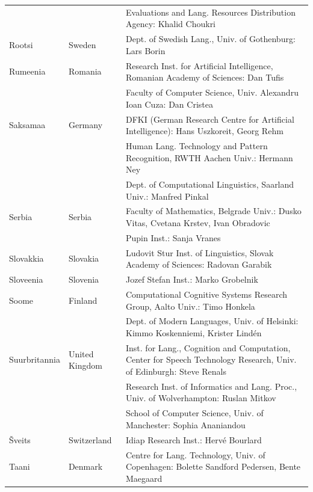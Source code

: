 \documentclass[]{../metanetpaper}
\begin{document}
\begin{longtable}{llp{105mm}}
  & & Evaluations and Lang. Resources Distribution Agency: Khalid Choukri\\ \addlinespace 
  Rootsi & \textcolor{grey1}{Sweden} & Dept. of Swedish Lang., Univ. of Gothenburg: Lars Borin \\ \addlinespace 
  Rumeenia & \textcolor{grey1}{Romania} & Research Inst. for Artificial Intelligence, Romanian Academy of Sciences: Dan Tufis \\ \addlinespace
  & & Faculty of Computer Science, Univ. Alexandru Ioan Cuza: Dan Cristea \\ \addlinespace
  Saksamaa & \textcolor{grey1}{Germany} & DFKI (German Research Centre for Artificial Intelligence): Hans Uszkoreit, Georg Rehm\\ \addlinespace
  & & Human Lang. Technology and Pattern Recognition, RWTH Aachen Univ.: Hermann Ney \\ \addlinespace
  & & Dept. of Computational Linguistics, Saarland Univ.: Manfred Pinkal\\ 
 \addlinespace  
  Serbia & \textcolor{grey1}{Serbia} & Faculty of Mathematics, Belgrade Univ.: Dusko Vitas, Cvetana Krstev, Ivan Obradovic \\ \addlinespace
  & & Pupin Inst.: Sanja Vranes \\ \addlinespace  
  Slovakkia & \textcolor{grey1}{Slovakia} & Ludovit Stur Inst. of Linguistics, Slovak Academy of Sciences: Radovan Garabik \\ \addlinespace 
  Sloveenia & \textcolor{grey1}{Slovenia} & Jozef Stefan Inst.: Marko Grobelnik \\ \addlinespace 
  Soome & \textcolor{grey1}{Finland} & Computational Cognitive Systems Research Group, Aalto Univ.: Timo Honkela\\ \addlinespace
  & & Dept. of Modern Languages, Univ. of Helsinki: Kimmo Koskenniemi, Krister Lindén \\ \addlinespace
  Suurbritannia & \textcolor{grey1}{United Kingdom} & Inst. for Lang., Cognition and Computation, Center for Speech Technology Research, Univ. of Edinburgh: Steve Renals \\ \addlinespace 
  & & Research Inst. of Informatics and Lang. Proc., Univ. of Wolverhampton: Ruslan Mitkov \\ \addlinespace 
  & & School of Computer Science, Univ. of Manchester: Sophia Ananiandou \\ \addlinespace 
  Šveits & \textcolor{grey1}{Switzerland} & Idiap Research Inst.: Hervé Bourlard \\ 
\addlinespace Taani &  \textcolor{grey1}{Denmark} & Centre for Lang. Technology, Univ. of Copenhagen: Bolette Sandford Pedersen, Bente Maegaard\\

\end{longtable}
\end{document}
